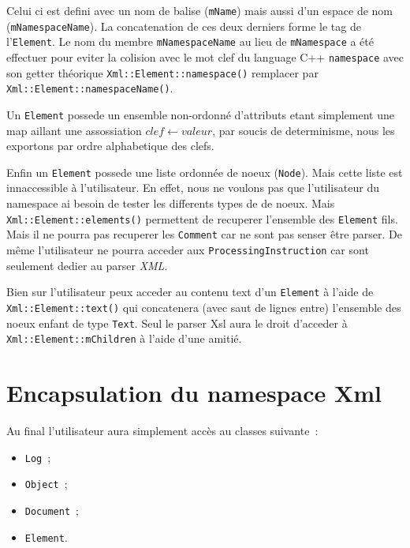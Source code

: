         Celui ci est defini avec un nom de balise (\lstinline$mName$) mais aussi d'un espace de nom (\lstinline$mNamespaceName$). La concatenation de ces deux derniers forme le tag de l'\lstinline$Element$. Le nom du membre \lstinline$mNamespaceName$ au lieu de \lstinline$mNamespace$ a \'et\'e effectuer pour eviter la colision avec le mot clef du language C++ \lstinline$namespace$ avec son getter th\'eorique \lstinline$Xml::Element::namespace()$ remplacer par \lstinline$Xml::Element::namespaceName()$.

        Un \lstinline$Element$ possede un ensemble non-ordonné d'attributs etant simplement une map aillant une assossiation $clef \leftarrow valeur$, par soucis de determinisme, nous les exportons par ordre alphabetique des clefs.

        Enfin un \lstinline$Element$ possede une liste ordonn\'ee de noeux (\lstinline$Node$). Mais cette liste est innaccessible \`a l'utilisateur. En effet, nous ne voulons pas que l'utilisateur du namespace ai besoin de tester les differents types de de noeux. Mais \lstinline$Xml::Element::elements()$ permettent de recuperer
        l'ensemble des \lstinline$Element$ fils. Mais il ne pourra pas recuperer les \lstinline$Comment$ car ne sont pas senser \^etre parser. De m\^eme l'utilisateur ne pourra acceder aux \lstinline$ProcessingInstruction$ car sont seulement dedier au parser \textit{XML}.

        Bien sur l'utilisateur peux acceder au contenu text d'un \lstinline$Element$ \`a l'aide de \lstinline$Xml::Element::text()$ qui concatenera (avec saut de lignes entre) l'ensemble des noeux enfant de type \lstinline$Text$. Seul le parser Xsl aura le droit d'acceder \`a \lstinline$Xml::Element::mChildren$ \`a l'aide d'une amiti\'e.

\section{Encapsulation du namespace Xml}
    Au final l'utilisateur aura simplement acc\`es au classes suivante~:

    \begin{itemize}
        \item \lstinline$Log$~;
        \item \lstinline$Object$~;
        \item \lstinline$Document$~;
        \item \lstinline$Element$.
    \end{itemize}

